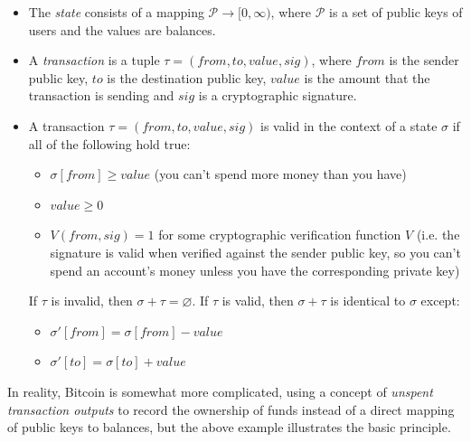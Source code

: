 \documentclass[11pt,a4paper]{article}
\makeatletter
\theoremstyle{plain}
\theoremstyle{definition}
\theoremstyle{remark}
\newcommand{\ie}{i.e.\@\xspace}
\makeatother
\begin{document}
\begin{itemize}
\item
The \emph{state} consists of a mapping $\mathcal{P} \rightarrow [0, \infty)$, where $\mathcal{P}$ is a set of public keys of users and the values are balances.
\item
A \emph{transaction} is a tuple $\tau = (from, to, value, sig)$, where $from$ is the sender public key, $to$ is the destination public key, $value$ is the amount that the transaction is sending and $sig$ is a cryptographic signature.
\item
A transaction $\tau = (from, to, value, sig)$ is valid in the context of a state $\sigma$ if all of the following hold true:
    \begin{itemize}
    \item
    $\sigma[from] \ge value$ (you can't spend more money than you have)
    \item
    $value \ge 0$
    \item
    $V(from, sig) = 1$ for some cryptographic verification function $V$ (\ie the signature is valid when verified against the sender public key, so you can't spend an account's money unless you have the corresponding private key)
    \end{itemize}
If $\tau$ is invalid, then $\sigma + \tau = \varnothing$. If $\tau$ is valid, then $\sigma + \tau$ is identical to $\sigma$ except:
    \begin{itemize}
    \item
    $\sigma'[from] = \sigma[from] - value$
    \item
    $\sigma'[to] = \sigma[to] + value$
    \end{itemize}
\end{itemize}

In reality, Bitcoin is somewhat more complicated, using a concept of \emph{unspent transaction outputs} to record the ownership of funds instead of a direct mapping of public keys to balances, but the above example illustrates the basic principle.
\end{document}

